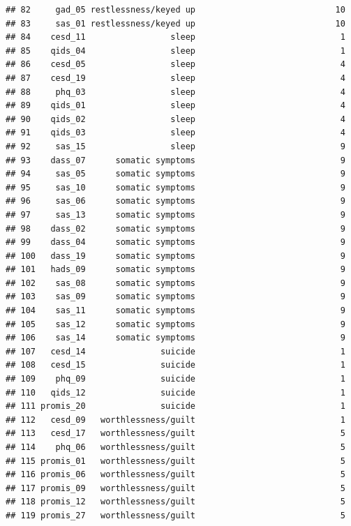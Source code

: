\documentclass[
]{article}
\begin{document}
\begin{verbatim}
## 82     gad_05 restlessness/keyed up                            10
## 83     sas_01 restlessness/keyed up                            10
## 84    cesd_11                 sleep                             1
## 85    qids_04                 sleep                             1
## 86    cesd_05                 sleep                             4
## 87    cesd_19                 sleep                             4
## 88     phq_03                 sleep                             4
## 89    qids_01                 sleep                             4
## 90    qids_02                 sleep                             4
## 91    qids_03                 sleep                             4
## 92     sas_15                 sleep                             9
## 93    dass_07      somatic symptoms                             9
## 94     sas_05      somatic symptoms                             9
## 95     sas_10      somatic symptoms                             9
## 96     sas_06      somatic symptoms                             9
## 97     sas_13      somatic symptoms                             9
## 98    dass_02      somatic symptoms                             9
## 99    dass_04      somatic symptoms                             9
## 100   dass_19      somatic symptoms                             9
## 101   hads_09      somatic symptoms                             9
## 102    sas_08      somatic symptoms                             9
## 103    sas_09      somatic symptoms                             9
## 104    sas_11      somatic symptoms                             9
## 105    sas_12      somatic symptoms                             9
## 106    sas_14      somatic symptoms                             9
## 107   cesd_14               suicide                             1
## 108   cesd_15               suicide                             1
## 109    phq_09               suicide                             1
## 110   qids_12               suicide                             1
## 111 promis_20               suicide                             1
## 112   cesd_09   worthlessness/guilt                             1
## 113   cesd_17   worthlessness/guilt                             5
## 114    phq_06   worthlessness/guilt                             5
## 115 promis_01   worthlessness/guilt                             5
## 116 promis_06   worthlessness/guilt                             5
## 117 promis_09   worthlessness/guilt                             5
## 118 promis_12   worthlessness/guilt                             5
## 119 promis_27   worthlessness/guilt                             5

\end{verbatim}
\end{document}

